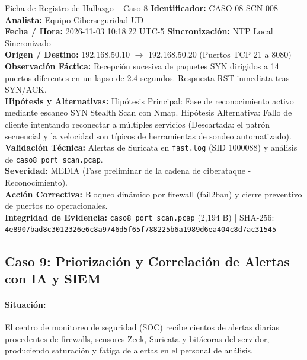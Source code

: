 \documentclass[11pt,letterpaper]{article}
\begin{document}
\begin{hallazgobox}{Ficha de Registro de Hallazgo -- Caso 8}
    \textbf{Identificador:} CASO-08-SCN-008 \hfill \textbf{Analista:} Equipo Ciberseguridad UD\\
    \textbf{Fecha / Hora:} 2026-11-03 10:18:22 UTC-5 \hfill \textbf{Sincronización:} NTP Local Sincronizado\\
    \textbf{Origen / Destino:} 192.168.50.10 $\rightarrow$ 192.168.50.20 (Puertos TCP 21 a 8080)\\
    \textbf{Observación Fáctica:} Recepción sucesiva de paquetes SYN dirigidos a 14 puertos diferentes en un lapso de 2.4 segundos. Respuesta RST inmediata tras SYN/ACK.\\
    \textbf{Hipótesis y Alternativas:} Hipótesis Principal: Fase de reconocimiento activo mediante escaneo SYN Stealth Scan con Nmap. Hipótesis Alternativa: Fallo de cliente intentando reconectar a múltiples servicios (Descartada: el patrón secuencial y la velocidad son típicos de herramientas de sondeo automatizado).\\
    \textbf{Validación Técnica:} Alertas de Suricata en \texttt{fast.log} (SID 1000088) y análisis de \texttt{caso8\_port\_scan.pcap}.\\
    \textbf{Severidad:} MEDIA (Fase preliminar de la cadena de ciberataque - Reconocimiento).\\
    \textbf{Acción Correctiva:} Bloqueo dinámico por firewall (fail2ban) y cierre preventivo de puertos no operacionales.\\
    \textbf{Integridad de Evidencia:} \texttt{caso8\_port\_scan.pcap} (2,194 B) | SHA-256: \texttt{4e8907bad8c3012326e6c8a9746d5f65f788225b6a1989d6ea404c8d7ac31545}
\end{hallazgobox}

\newpage
\subsection{Caso 9: Priorización y Correlación de Alertas con IA y SIEM}

\paragraph{Situación:} El centro de monitoreo de seguridad (SOC) recibe cientos de alertas diarias procedentes de firewalls, sensores Zeek, Suricata y bitácoras del servidor, produciendo saturación y fatiga de alertas en el personal de análisis.
\end{document}

